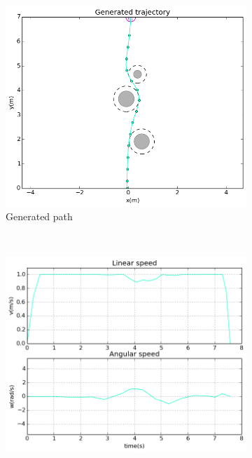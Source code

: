 \begin{figure}[!h]
        \centering
        ~ %
        \begin{subfigure}[b]{0.48\textwidth}
                \includegraphics[width=\textwidth]{./images/realtime/sim_results/p_3_0.48_2.4_11_4_0.001_15_40_20_5.0_0.1_3.0_0.5_1.0_10.0/multirobot-path.png}
                \caption{Generated path}\label{fig:rpath}
        \end{subfigure}
        ~ %
        \begin{subfigure}[b]{0.48\textwidth}
		\includegraphics[width=\textwidth]{./images/realtime/sim_results/p_3_0.48_2.4_11_4_0.001_15_40_20_5.0_0.1_3.0_0.5_1.0_10.0/multirobot-vw.png}

\end{subfigure}
\end{figure}
